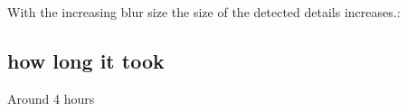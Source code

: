 \documentclass{article}
\begin{document}
 \par
With the increasing blur size the size of the detected details increases.:

\subsection{how long it took}
Around 4 hours
\end{document}
